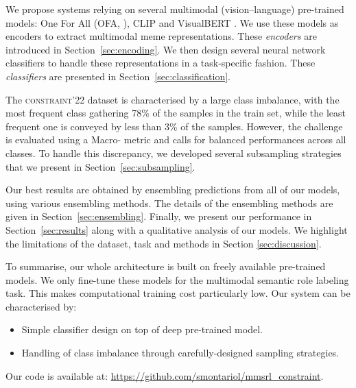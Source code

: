 We propose systems relying on several multimodal (vision--language) pre-trained models: One For All (OFA, \citealp{ofa}), CLIP \cite{radford2021learning} and VisualBERT \cite{li2019visualbert}.
We use these models as encoders to extract multimodal meme representations.
These \emph{encoders} are introduced in Section~\ref{sec:encoding}.
We then design several neural network classifiers to handle these representations in a task-specific fashion.
These \emph{classifiers} are presented in Section~\ref{sec:classification}.

The \textsc{constraint}'22 dataset is characterised by a large class imbalance, with the most frequent class gathering 78\% of the samples in the train set, while the least frequent one is conveyed by less than 3\% of the samples.
However, the challenge is evaluated using a Macro-\fone{} metric and calls for balanced performances across all classes.
To handle this discrepancy, we developed several subsampling strategies that we present in Section~\ref{sec:subsampling}.

Our best results are obtained by ensembling predictions from all of our models, using various ensembling methods.
The details of the ensembling methods are given in Section~\ref{sec:ensembling}.
Finally, we present our performance in Section~\ref{sec:results} along with a qualitative analysis of our models.
We highlight the limitations of the dataset, task and methods in Section \ref{sec:discussion}.

To summarise, our whole architecture is built on freely available pre-trained models.
We only fine-tune these models for the multimodal semantic role labeling task.
This makes computational training cost particularly low.
Our system can be characterised by:
\begin{itemize}[nosep]
	\item Simple classifier design on top of deep pre-trained model.
	\item Handling of class imbalance through carefully-designed sampling strategies.
\end{itemize}
Our code is available at: \url{https://github.com/smontariol/mmsrl_constraint}.

